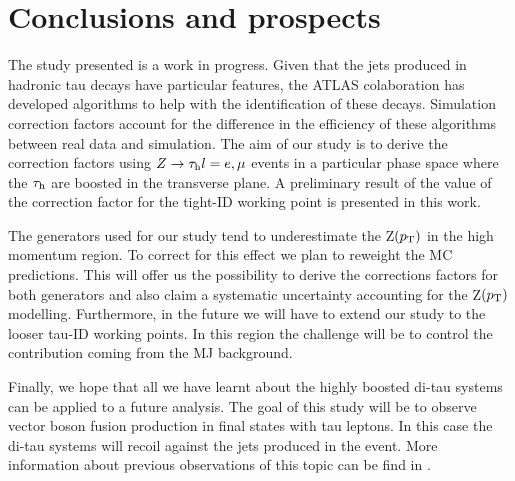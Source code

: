 \chapter{Conclusions and prospects}\label{chap6}
The study presented is a work in progress. Given that the jets produced in hadronic tau decays have particular features, the ATLAS colaboration has developed algorithms to help with the identification of these decays. Simulation correction factors account for the difference in the efficiency of these algorithms between real data and simulation. The aim of our study is to derive the correction factors using $Z\to\tau_\text{h} l=e,\mu$ events in a particular phase space where the $\tau_\text{h}$ are boosted in the transverse plane. A preliminary result of the value of the correction factor for the tight-ID working point is presented in this work.

The generators used for our study tend to underestimate the Z$(p_\text{T})$ in the high momentum region. To correct for this effect we plan to reweight the MC predictions. This will offer us the possibility to derive the corrections factors for both generators and also claim a systematic uncertainty accounting for the Z$(p_\text{T})$ modelling. Furthermore, in the future we will have to extend our study to the looser tau-ID working points. In this region the challenge will be to control the contribution coming from the MJ background. 

Finally, we hope that all we have learnt about the highly boosted di-tau systems can be applied to a future analysis.  The goal of this study will be to observe vector boson fusion production in final states with tau leptons. In this case the di-tau systems will recoil against the jets produced in the event. More information about previous observations of this topic can be find in \cite{Aad:2014dta,Aaboud:2017emo}. 

